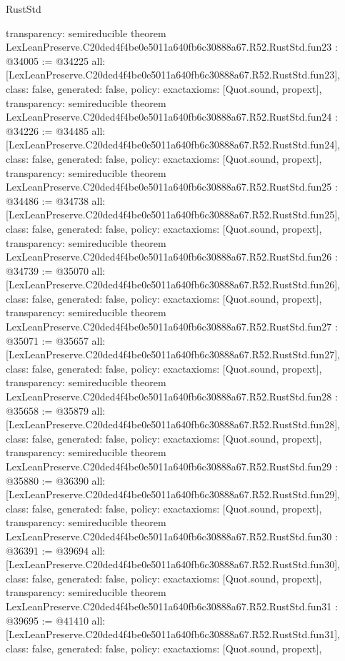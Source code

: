 \begin{lexlean}{RustStd}
\begin{coremodule}
{  transparency: semireducible
}
theorem LexLeanPreserve.C20ded4f4be0e5011a640fb6c30888a67.R52.RustStd.fun23 : @34005 := @34225 {
  all: [LexLeanPreserve.C20ded4f4be0e5011a640fb6c30888a67.R52.RustStd.fun23],
  class: false,
  generated: false,
  policy: exact{axioms: [Quot.sound, propext]},
  transparency: semireducible
}
theorem LexLeanPreserve.C20ded4f4be0e5011a640fb6c30888a67.R52.RustStd.fun24 : @34226 := @34485 {
  all: [LexLeanPreserve.C20ded4f4be0e5011a640fb6c30888a67.R52.RustStd.fun24],
  class: false,
  generated: false,
  policy: exact{axioms: [Quot.sound, propext]},
  transparency: semireducible
}
theorem LexLeanPreserve.C20ded4f4be0e5011a640fb6c30888a67.R52.RustStd.fun25 : @34486 := @34738 {
  all: [LexLeanPreserve.C20ded4f4be0e5011a640fb6c30888a67.R52.RustStd.fun25],
  class: false,
  generated: false,
  policy: exact{axioms: [Quot.sound, propext]},
  transparency: semireducible
}
theorem LexLeanPreserve.C20ded4f4be0e5011a640fb6c30888a67.R52.RustStd.fun26 : @34739 := @35070 {
  all: [LexLeanPreserve.C20ded4f4be0e5011a640fb6c30888a67.R52.RustStd.fun26],
  class: false,
  generated: false,
  policy: exact{axioms: [Quot.sound, propext]},
  transparency: semireducible
}
theorem LexLeanPreserve.C20ded4f4be0e5011a640fb6c30888a67.R52.RustStd.fun27 : @35071 := @35657 {
  all: [LexLeanPreserve.C20ded4f4be0e5011a640fb6c30888a67.R52.RustStd.fun27],
  class: false,
  generated: false,
  policy: exact{axioms: [Quot.sound, propext]},
  transparency: semireducible
}
theorem LexLeanPreserve.C20ded4f4be0e5011a640fb6c30888a67.R52.RustStd.fun28 : @35658 := @35879 {
  all: [LexLeanPreserve.C20ded4f4be0e5011a640fb6c30888a67.R52.RustStd.fun28],
  class: false,
  generated: false,
  policy: exact{axioms: [Quot.sound, propext]},
  transparency: semireducible
}
theorem LexLeanPreserve.C20ded4f4be0e5011a640fb6c30888a67.R52.RustStd.fun29 : @35880 := @36390 {
  all: [LexLeanPreserve.C20ded4f4be0e5011a640fb6c30888a67.R52.RustStd.fun29],
  class: false,
  generated: false,
  policy: exact{axioms: [Quot.sound, propext]},
  transparency: semireducible
}
theorem LexLeanPreserve.C20ded4f4be0e5011a640fb6c30888a67.R52.RustStd.fun30 : @36391 := @39694 {
  all: [LexLeanPreserve.C20ded4f4be0e5011a640fb6c30888a67.R52.RustStd.fun30],
  class: false,
  generated: false,
  policy: exact{axioms: [Quot.sound, propext]},
  transparency: semireducible
}
theorem LexLeanPreserve.C20ded4f4be0e5011a640fb6c30888a67.R52.RustStd.fun31 : @39695 := @41410 {
  all: [LexLeanPreserve.C20ded4f4be0e5011a640fb6c30888a67.R52.RustStd.fun31],
  class: false,
  generated: false,
  policy: exact{axioms: [Quot.sound, propext]},
}
\end{coremodule}
\end{lexlean}
